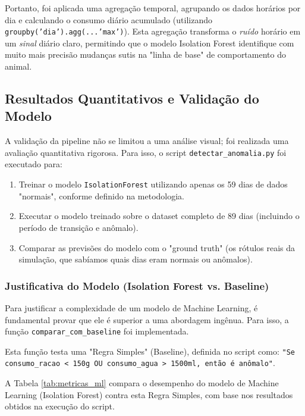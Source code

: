 Portanto, foi aplicada uma agregação temporal, agrupando os dados horários por dia e calculando o consumo diário acumulado (utilizando \texttt{groupby('dia').agg(...'max')}). Esta agregação transforma o \textit{ruído} horário em um \textit{sinal} diário claro, permitindo que o modelo Isolation Forest identifique com muito mais precisão mudanças sutis na "linha de base" de comportamento do animal.

\subsection{Resultados Quantitativos e Validação do Modelo}

A validação da pipeline não se limitou a uma análise visual; foi realizada uma avaliação quantitativa rigorosa. Para isso, o script \texttt{detectar\_anomalia.py} foi executado para:

\begin{enumerate}
    \item Treinar o modelo \texttt{IsolationForest} utilizando apenas os 59 dias de dados "normais", conforme definido na metodologia.
    \item Executar o modelo treinado sobre o dataset completo de 89 dias (incluindo o período de transição e anômalo).
    \item Comparar as previsões do modelo com o "ground truth" (os rótulos reais da simulação, que sabíamos quais dias eram normais ou anômalos).
\end{enumerate}

\subsubsection{Justificativa do Modelo (Isolation Forest vs. Baseline)}

Para justificar a complexidade de um modelo de Machine Learning, é fundamental provar que ele é superior a uma abordagem ingênua. Para isso, a função \texttt{comparar\_com\_baseline} foi implementada.

Esta função testa uma "Regra Simples" (Baseline), definida no script como:
\texttt{"Se consumo\_racao < 150g OU consumo\_agua > 1500ml, então é anômalo"}.

A Tabela \ref{tab:metricas_ml} compara o desempenho do modelo de Machine Learning (Isolation Forest) contra esta Regra Simples, com base nos resultados obtidos na execução do script.

